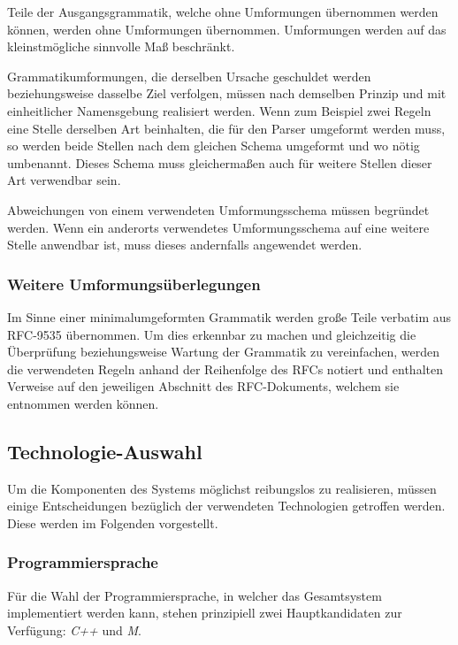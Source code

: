 \documentclass[oneside]{ausarbeitung}
\begin{document}
Teile der Ausgangsgrammatik, welche ohne Umformungen übernommen werden können, werden ohne Umformungen übernommen. Umformungen werden auf das kleinstmögliche sinnvolle Maß beschränkt.
	
Grammatikumformungen, die derselben Ursache geschuldet werden beziehungsweise dasselbe Ziel verfolgen, müssen nach demselben Prinzip und mit einheitlicher Namensgebung realisiert werden. Wenn zum Beispiel zwei Regeln eine Stelle derselben Art beinhalten, die für den Parser umgeformt werden muss, so werden beide Stellen nach dem gleichen Schema umgeformt und wo nötig umbenannt. Dieses Schema muss gleichermaßen auch für weitere Stellen dieser Art verwendbar sein.
	
Abweichungen von einem verwendeten Umformungsschema müssen begründet werden. Wenn ein anderorts verwendetes Umformungsschema auf eine weitere Stelle anwendbar ist, muss dieses andernfalls angewendet werden. 
	
\subsubsection{Weitere Umformungsüberlegungen}
	
Im Sinne einer minimalumgeformten Grammatik werden große Teile verbatim aus RFC-9535 übernommen. Um dies erkennbar zu machen und gleichzeitig die Überprüfung beziehungsweise Wartung der Grammatik zu vereinfachen, werden die verwendeten Regeln anhand der Reihenfolge des RFCs notiert und enthalten Verweise auf den jeweiligen Abschnitt des RFC-Dokuments, welchem sie entnommen werden können. 
	
	
	
\subsection{Technologie-Auswahl}

Um die Komponenten des Systems möglichst reibungslos zu realisieren, müssen einige Entscheidungen bezüglich der verwendeten Technologien getroffen werden. Diese werden im Folgenden vorgestellt.



\subsubsection{Programmiersprache}

Für die Wahl der Programmiersprache, in welcher das Gesamtsystem implementiert werden kann, stehen prinzipiell zwei Hauptkandidaten zur Verfügung: \textit{C++} und \textit{M}.
\end{document}

